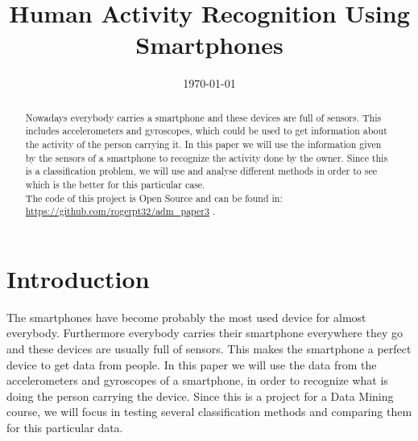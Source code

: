 \documentclass[conference,a4paper]{IEEEtran}
\begin{document}
\title{Human Activity Recognition Using Smartphones}

\author{
}

\date{\today}

\maketitle

\begin{abstract}
Nowadays everybody carries a smartphone and these devices are full of sensors. This includes accelerometers and gyroscopes, which could be used to get information about the activity of the person carrying it. In this paper we will use the information given by the sensors of a smartphone to recognize the activity done by the owner. Since this is a classification problem, we will use and analyse different methods in order to see which is the better for this particular case.\\
The code of this project is Open Source and can be found in: \url{https://github.com/rogerpt32/adm_paper3} \cite{code}.
\end{abstract}

\section{Introduction}
The smartphones have become probably the most used device for almost everybody. Furthermore everybody carries their smartphone everywhere they go and these devices are usually full of sensors. This makes the smartphone a perfect device to get data from people. In this paper we will use the data from the accelerometers and gyroscopes of a smartphone, in order to recognize what is doing the person carrying the device. Since this is a project for a Data Mining course, we will focus in testing several classification methods and comparing them for this particular data.
\end{document}
